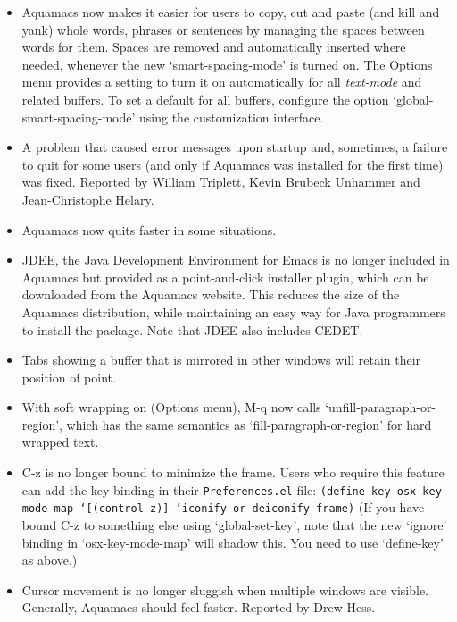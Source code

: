 \begin{itemize}

\item Aquamacs now makes it easier for users to copy, cut and paste (and kill and yank) whole words, phrases or sentences by managing the spaces between words for them.  Spaces are removed and automatically inserted where needed, whenever the new `smart-spacing-mode' is turned on.  The Options menu provides a setting to turn it on automatically for all {\em text-mode} and related buffers.  To set a default for all buffers, configure the option `global-smart-spacing-mode' using the customization interface.

\item A problem that caused error messages upon startup and, sometimes, a failure to quit for some users (and only if Aquamacs was installed for the first time) was fixed. 
Reported by William Triplett, Kevin Brubeck Unhammer and Jean-Christophe Helary.

\item Aquamacs now quits faster in some situations.

\item JDEE, the Java Development Environment for Emacs is no longer included in Aquamacs but provided as a point-and-click installer plugin, which can be downloaded from the Aquamacs website.  This reduces the size of the Aquamacs distribution, while maintaining an easy way for Java programmers to install the package.  Note that JDEE also includes CEDET.

\item Tabs showing a buffer that is mirrored in other windows will retain their position of point.

\item With soft wrapping on (Options menu), M-q now calls `unfill-paragraph-or-region', which has the same semantics as `fill-paragraph-or-region' for hard wrapped text.

\item C-z is no longer bound to minimize the frame.  Users who require this feature can add the key binding in their {\tt Preferences.el} file:
{\tt    (define-key osx-key-mode-map `[(control z)] 'iconify-or-deiconify-frame)}
(If you have bound C-z to something else using `global-set-key', note that the new `ignore' binding in `osx-key-mode-map' will shadow this.  You need to use `define-key' as above.)

\item Cursor movement is no longer sluggish when multiple windows are visible.  Generally, Aquamacs should feel  faster.
Reported by Drew Hess.


\end{itemize}
